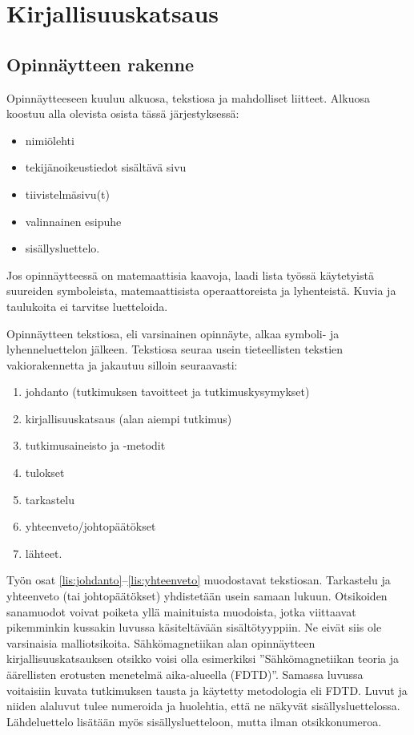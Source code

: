 \documentclass[finnish, 12pt, a4paper, arts, utf8, a-2b, online]{aaltothesis}
\begin{document}
\clearpage

\section{Kirjallisuuskatsaus}

\subsection{Opinnäytteen rakenne}

Opinnäytteeseen kuuluu alkuosa, tekstiosa ja mahdolliset liitteet. Alkuosa 
koostuu alla olevista osista tässä järjestyksessä:
\begin{itemize}
	\item nimiölehti
	\item tekijänoikeustiedot sisältävä sivu 
	\item tiivistelmäsivu(t) 
	\item valinnainen esipuhe 
	\item sisällysluettelo.
\end{itemize}
Jos opinnäytteessä on matemaattisia kaavoja, laadi lista työssä käytetyistä 
suureiden symboleista, matemaattisista operaattoreista ja lyhenteistä.  Kuvia ja 
taulukoita ei tarvitse luetteloida.

Opinnäytteen tekstiosa, eli varsinainen opinnäyte, alkaa symboli- ja 
lyhenneluettelon jälkeen. Tekstiosa seuraa usein tieteellisten tekstien 
vakiorakennetta ja jakautuu silloin seuraavasti:
\begin{enumerate}
	\item \label{lis:johdanto}johdanto (tutkimuksen tavoitteet ja 
	  tutkimuskysymykset)
	\item kirjallisuuskatsaus (alan aiempi tutkimus)
	\item tutkimusaineisto ja -metodit
	\item tulokset
	\item tarkastelu
	\item \label{lis:yhteenveto}yhteenveto/johtopäätökset
	\item lähteet.
\end{enumerate}
Työn osat \ref{lis:johdanto}--\ref{lis:yhteenveto} muodostavat tekstiosan. 
Tarkastelu ja yhteenveto (tai johtopäätökset) yhdistetään usein samaan lukuun. 
Otsikoiden sanamuodot voivat poiketa yllä mainituista muodoista, jotka 
viittaavat pikemminkin kussakin luvussa käsiteltävään sisältötyyppiin. Ne eivät 
siis ole varsinaisia malliotsikoita. Sähkömagnetiikan alan opinnäytteen 
kirjallisuuskatsauksen otsikko voisi olla esimerkiksi ”Sähkömagnetiikan teoria 
ja äärellisten erotusten menetelmä aika-alueella (FDTD)”. Samassa luvussa 
voitaisiin kuvata tutkimuksen tausta ja käytetty metodologia eli FDTD. Luvut ja 
niiden alaluvut tulee numeroida ja huolehtia, että ne näkyvät 
sisällysluettelossa. Lähdeluettelo lisätään myös sisällysluetteloon, mutta ilman 
otsikkonumeroa.
\end{document}
